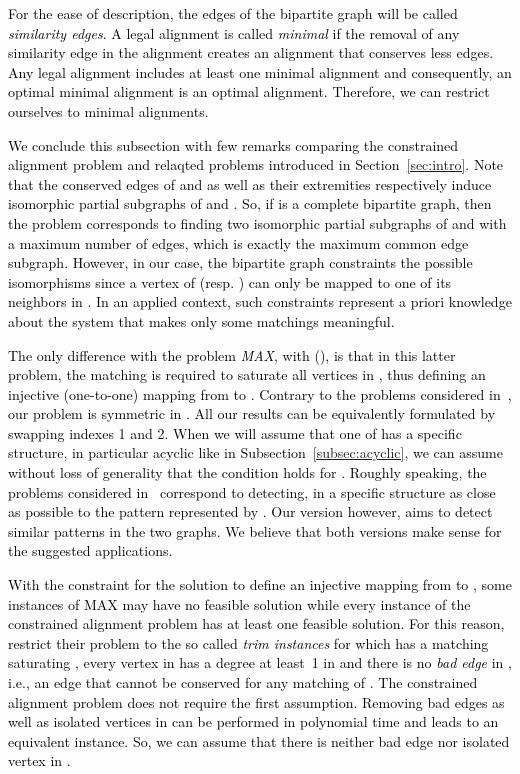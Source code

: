 \documentclass[final]{dmtcs-episciences}
\newcommand\mar[1]{\textcolor{black}{#1}}
\newcommand\ces[1]{\textcolor{black}{#1}}
\begin{document}
\ces{For the ease of description, the edges of the bipartite graph  will be called  \emph{ similarity edges}.}
\mar{A legal alignment is called {\em minimal} if the removal of any similarity edge in the alignment creates an alignment that conserves less edges. Any legal alignment includes at least one minimal alignment and consequently,  an optimal minimal alignment is an optimal alignment. Therefore, we can restrict ourselves to minimal alignments.}

\mar{We conclude this subsection with few remarks comparing the constrained alignment problem and relaqted problems introduced in Section~\ref{sec:intro}. Note that the conserved edges of  and  as well as their extremities respectively induce  isomorphic partial subgraphs of  and  . So, if  is a complete bipartite graph, then the problem corresponds to finding two isomorphic partial subgraphs of  and  with a maximum number of edges, which is exactly the maximum common edge subgraph.} 
\mar{However, in our case, the bipartite graph  constraints the possible  isomorphisms since a vertex of  (resp. ) can only be mapped to one of its neighbors in . In an applied context, such constraints represent a priori knowledge about the system that makes only some matchings meaningful.}

\mar{The only difference with the problem  \emph{ MAX},  with  
 (\citet{Fertin200990}), is that in this latter problem, the matching  is required to saturate all vertices in , thus defining an injective (one-to-one) mapping from  to . Contrary to the problems considered in~\citet{Fagnot2008,Fertin200990}, our problem is symmetric in . All our results can be equivalently formulated by swapping indexes 1 and 2. When we will assume that one of  has a specific structure, in particular acyclic like in Subsection~\ref{subsec:acyclic}, we can assume without loss of generality that the condition holds for .  Roughly speaking, the problems considered in~\citet{Fagnot2008,Fertin200990} correspond to detecting, in  a specific structure as close as possible to the pattern represented by . Our version however,   aims to detect similar patterns in the two graphs. We believe that both versions make sense for the suggested  applications.}
 
 
 \mar{With the constraint for the solution to define an injective mapping from  to , some instances of {MAX} may have no feasible solution while every instance of the constrained alignment problem has at least one feasible solution. For this reason, \citet{Fertin200990} restrict their problem to the so called  \emph{ trim instances} for which  has a matching saturating , every vertex in  has a degree at least~1 in  and there is no  \emph{ bad edge} in , i.e., an edge that cannot be conserved for any matching of . The constrained alignment problem does not require  the first assumption. Removing bad edges as well as isolated vertices in  can be performed in polynomial time and leads to an equivalent instance. So, we can assume that there is neither bad edge nor isolated vertex in .} 
 
\end{document}

